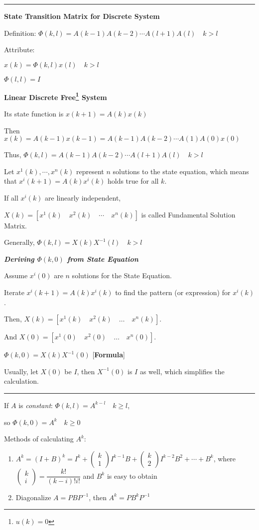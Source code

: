 \documentclass{article}
\newcommand{\sectionline}{\color{black}\rule[2pt]{0.45\textwidth}{0.05em}\color{black}}
\newcommand{\bigtitle}[1]{
	\noindent
	\textbf{#1}
}
\newcommand{\smalltitle}[1]{
	\noindent
	\textbf{\textit{#1}}
}
\begin{document}
\begin{spacing}{1.2}
\sectionline

\bigtitle{State Transition Matrix for Discrete System}

Definition: $\Phi(k, l)=A(k-1) A(k-2) \cdots A(l+1) A(l) \quad k>l$

Attribute: 

$x(k)=\Phi(k, l) x(l) \quad k>l$

$\Phi(l, l)=I$

\bigtitle{Linear Discrete Free\footnote{$u(k)=0$} System}

Its state function is $x(k+1)=A(k) x(k)$

Then $x(k)=A(k-1) x(k-1)=A(k-1) A(k-2) \cdots A(1) A(0) x(0)$

Thus, $\Phi(k, l)=A(k-1) A(k-2) \cdots A(l+1) A(l) \quad k>l$

Let $x^1(k),\cdots, x^n(k)$ represent $n$ solutions to the state equation, which means that
$x^i(k+1) = A(k)x^i(k)$ holds true for all $k$.

If all $x^i(k)$ are linearly independent,

$X(k)=\left[x^{1}(k) \quad x^{2}(k) \quad \cdots \quad x^{n}(k)\right]$ is called Fundamental Solution Matrix.

Generally, $\Phi(k, l)=X(k) X^{-1}(l) \quad k>l$

\smalltitle{Deriving $\Phi(k,0)$ from State Equation}

Assume $x^i(0)$ are $n$ solutions for the State Equation.

Iterate $x^i(k+1) = A(k)x^i(k)$ to find the pattern (or expression) for $x^i(k)$.

Then, $X(k) = \left[ x^1(k) \quad x^2(k) \quad \ldots \quad x^n(k) \right]$.

And $X(0) = \left[ x^1(0) \quad x^2(0) \quad \ldots \quad x^n(0) \right] $.

$\Phi(k,0) = X(k) X^{-1}(0)$ [\textbf{Formula}]

Usually, let $X(0)$ be $I$, then $X^{-1}(0)$ is $I$ as well, which simplifies the calculation.

\sectionline

If $A$ is \textit{constant}:
$\Phi(k, l)=A^{k-l} \quad k \geq l$,

so $\Phi(k, 0)=A^{k} \quad k \geq 0$

Methods of calculating $A^k$:

\begin{enumerate}
	\item $A^{k}=(I+B)^{k}=I^{k}+\left( \begin{array}{c}{k} \\ {1}\end{array}\right) I^{k-1} B+\left( \begin{array}{l}{k} \\ {2}\end{array}\right) I^{k-2} B^{2}+\cdots+B^{k}$, where $\left( \begin{array}{c}{k} \\ {i}\end{array}\right)=\dfrac{k !}{(k-i) ! i !}$ and $B^k$ is easy to obtain
	\item Diagonalize $A = PBP^{-1}$, then $A^{k} = PB^kP^{-1}$
\end{enumerate}


\end{spacing}
\end{document}
